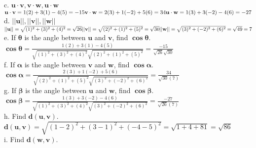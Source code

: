 \documentclass[11pt]{article}
\begin{document}
c. $\textbf{u}\cdot\textbf{v}, \textbf{v}\cdot\textbf{w}, \textbf{u}\cdot\textbf{w}$ \\ [5pt]

$
\textbf{u}\cdot\textbf{v} =
1(2)+3(1)-4(5) = -15\\
\textbf{v}\cdot\textbf{w} = 2(3)+1(-2)+5(6) = 34\\
\textbf{u}\cdot\textbf{w} = 1(3)+3(-2)-4(6) = -27
$ \\[5pt]

d. $||\textbf{u}||,||\textbf{v}||,||\textbf{w}||$ \\[5pt]

$
||\textbf{u}|| =
\sqrt{(1)^2+(3)^2+(4)^2} = \sqrt{26} \\
||\textbf{v}|| = 
\sqrt{(2)^2+(1)^2+(5)^2}= \sqrt{30} \\
||\textbf{w}|| = 
\sqrt{(3)^2+(-2)^2+(6)^2} = \sqrt{49} = 7
$ \\[5pt]

e. If $\mathbf{\theta}$ is the angle between $\mathbf{u}$ and $\mathbf{v}$, find $\mathbf{\cos \theta}$. \\[5pt]

$
\mathbf{\cos \theta}
= \frac{1(2)+3(1)-4(5)}{\sqrt{(1)^2+(3)^2+(4)^2}\sqrt{(2)^2+(1)^2+(5)^2}}
= \frac{-15}{\sqrt{26} \sqrt{30}}
$ \\[5pt]

f. If $\mathbf{\alpha}$ is the angle between $\mathbf{v}$ and $\mathbf{w}$, find $\mathbf{\cos \alpha}$. \\[5pt]

$
\mathbf{\cos \alpha}
= \frac{2(3)+1(-2)+5(6)}{\sqrt{(2)^2+(1)^2+(5)^2}\sqrt{(3)^2+(-2)^2+(6)^2}}
= \frac{34}{\sqrt{30}(7)}
$ \\[5pt]

g. If $\mathbf{\beta}$ is the angle between $\mathbf{u}$ and $\mathbf{w}$, find $\mathbf{\cos \beta}$. \\[5pt]

$
\mathbf{\cos \beta}
= \frac{1(3)+3(-2)-4(6)}{\sqrt{(1)^2+(3)^2+(4)^2}\sqrt{(3)^2+(-2)^2+(6)^2}}
= \frac{-27}{\sqrt{26}(7)}
$ \\[5pt]

h. Find $\mathbf{d(u,v)}$. \\[5pt]

$
\mathbf{d(u,v)}
= \sqrt{(1-2)^2 + (3-1)^2 + (-4-5)^2}
= \sqrt{1 + 4 + 81}
= \sqrt{86}
$ \\[5pt]

i. Find $\mathbf{d(w,v)}$. \\[5pt]
\end{document}
